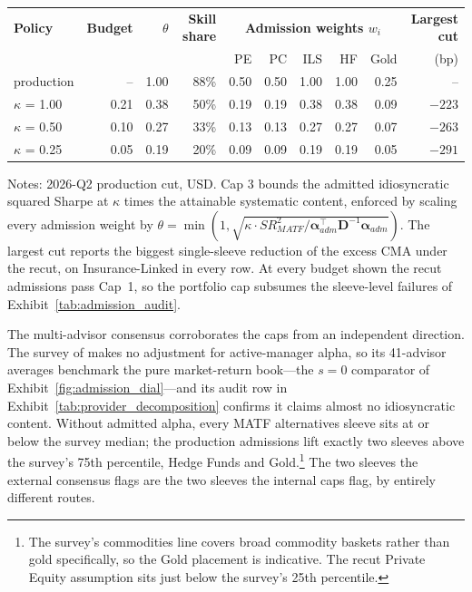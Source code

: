\documentclass[pdftex,12pt,a4paper]{article}
\begin{document}
\begin{table}[H]
	\label{tab:cap3_grid}\vspace*{-0.5\baselineskip}
	\begin{center}
		\footnotesize
		\begin{tabular}{l rrr rrrrr r}
			\toprule
			\textbf{Policy} & \textbf{Budget} & $\theta$ & \textbf{Skill share} & \multicolumn{5}{c}{\textbf{Admission weights $w_i$}} & \textbf{Largest cut} \\
			& & & & PE & PC & ILS & HF & Gold & (bp) \\
			\midrule
			production & -- & 1.00 & 88\% & 0.50 & 0.50 & 1.00 & 1.00 & 0.25 & -- \\
			$\kappa$ = 1.00 & 0.21 & 0.38 & 50\% & 0.19 & 0.19 & 0.38 & 0.38 & 0.09 & $-223$ \\
			$\kappa$ = 0.50 & 0.10 & 0.27 & 33\% & 0.13 & 0.13 & 0.27 & 0.27 & 0.07 & $-263$ \\
			$\kappa$ = 0.25 & 0.05 & 0.19 & 20\% & 0.09 & 0.09 & 0.19 & 0.19 & 0.05 & $-291$ \\
			\bottomrule
		\end{tabular}
	\end{center}
	\vspace*{-0.5\baselineskip}
	{\footnotesize Notes: 2026-Q2 production cut, USD. Cap 3 bounds the admitted idiosyncratic squared Sharpe at $\kappa$ times the attainable systematic content, enforced by scaling every admission weight by $\theta = \min(1, \sqrt{\kappa \cdot SR^2_{MATF} / \boldsymbol\alpha_{adm}^{\intercal}\boldsymbol D^{-1}\boldsymbol\alpha_{adm}})$. The largest cut reports the biggest single-sleeve reduction of the excess CMA under the recut, on Insurance-Linked in every row. At every budget shown the recut admissions pass Cap~1, so the portfolio cap subsumes the sleeve-level failures of Exhibit~\ref{tab:admission_audit}.}
\end{table}

The multi-advisor consensus corroborates the caps from an independent direction. The survey of \citet{HorizonSurvey2025} makes no adjustment for active-manager alpha, so its 41-advisor averages benchmark the pure market-return book---the $s=0$ comparator of Exhibit~\ref{fig:admission_dial}---and its audit row in Exhibit~\ref{tab:provider_decomposition} confirms it claims almost no idiosyncratic content. Without admitted alpha, every MATF alternatives sleeve sits at or below the survey median; the production admissions lift exactly two sleeves above the survey's 75th percentile, Hedge Funds and Gold.\footnote{The survey's commodities line covers broad commodity baskets rather than gold specifically, so the Gold placement is indicative. The recut Private Equity assumption sits just below the survey's 25th percentile.} The two sleeves the external consensus flags are the two sleeves the internal caps flag, by entirely different routes.
\end{document}
